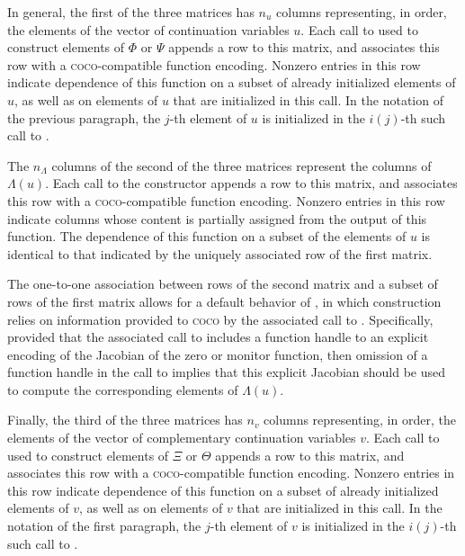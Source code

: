 In general, the first of the three matrices has $n_u$ columns representing, in order, the elements of the vector of continuation variables $u$. Each call to  used to construct elements of $\Phi$ or $\Psi$ appends a row to this matrix, and associates this row with a \textsc{coco}-compatible function encoding. Nonzero entries in this row indicate dependence of this function on a subset of already initialized elements of $u$, as well as on elements of $u$ that are initialized in this call. In the notation of the previous paragraph, the $j$-th element of $u$ is initialized in the $i(j)$-th such call to .

The $n_\Lambda$ columns of the second of the three matrices represent the columns of $\Lambda(u)$. Each call to the  constructor appends a row to this matrix, and associates this row with a \textsc{coco}-compatible function encoding. Nonzero entries in this row indicate columns whose content is partially assigned from the output of this function. The dependence of this function on a subset of the elements of $u$ is identical to that indicated by the uniquely associated row of the first matrix.

The one-to-one association between rows of the second matrix and a subset of rows of the first matrix allows for a default behavior of , in which construction relies on information provided to \textsc{coco} by the associated call to . Specifically, provided that the associated call to  includes a function handle to an explicit encoding of the Jacobian of the zero or monitor function, then omission of a function handle in the call to  implies that this explicit Jacobian should be used to compute the corresponding elements of $\Lambda(u)$.

Finally, the third of the three matrices has $n_v$ columns representing, in order, the elements of the vector of complementary continuation variables $v$. Each call to  used to construct elements of $\Xi$ or $\Theta$ appends a row to this matrix, and associates this row with a \textsc{coco}-compatible function encoding. Nonzero entries in this row indicate dependence of this function on a subset of already initialized elements of $v$, as well as on elements of $v$ that are initialized in this call. In the notation of the first paragraph, the $j$-th element of $v$ is initialized in the $i(j)$-th such call to .

